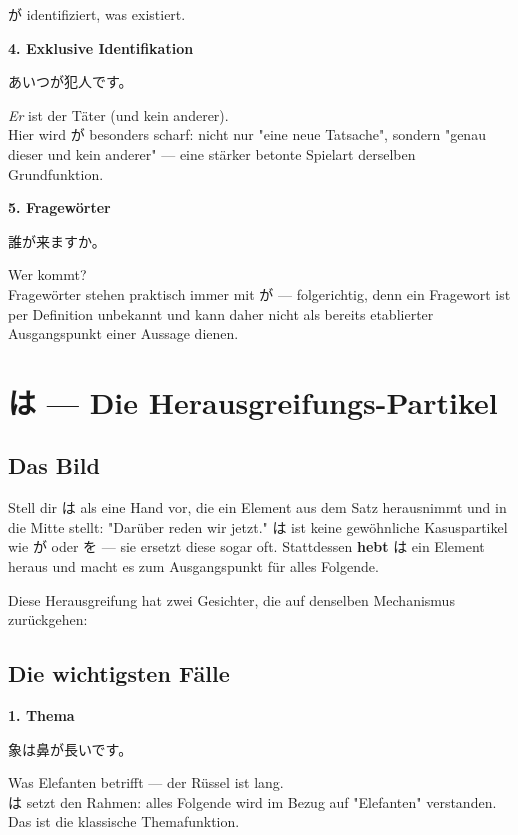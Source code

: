 \documentclass[12pt]{book}
\begin{document}
が identifiziert, was existiert.

\textbf{4. Exklusive Identifikation}
\par\quad あいつが犯人です。\\
\par\quad \emph{Er} ist der Täter (und kein anderer).\\

Hier wird が besonders scharf: nicht nur "eine neue Tatsache", sondern "genau dieser und kein anderer" — eine stärker betonte Spielart derselben Grundfunktion.

\textbf{5. Fragewörter}
\par\quad 誰が来ますか。\\
\par\quad Wer kommt?\\

Fragewörter stehen praktisch immer mit が — folgerichtig, denn ein Fragewort ist per Definition unbekannt und kann daher nicht als bereits etablierter Ausgangspunkt einer Aussage dienen.


\chapter{は — Die Herausgreifungs-Partikel}

\section*{Das Bild}

Stell dir は als eine Hand vor, die ein Element aus dem Satz herausnimmt und in die Mitte stellt: "Darüber reden wir jetzt." は ist keine gewöhnliche Kasuspartikel wie が oder を — sie ersetzt diese sogar oft. Stattdessen \textbf{hebt} は ein Element heraus und macht es zum Ausgangspunkt für alles Folgende.

Diese Herausgreifung hat zwei Gesichter, die auf denselben Mechanismus zurückgehen:

\section*{Die wichtigsten Fälle}

\textbf{1. Thema}
\par\quad 象は鼻が長いです。\\
\par\quad Was Elefanten betrifft — der Rüssel ist lang.\\

は setzt den Rahmen: alles Folgende wird im Bezug auf "Elefanten" verstanden. Das ist die klassische Themafunktion.
\end{document}
